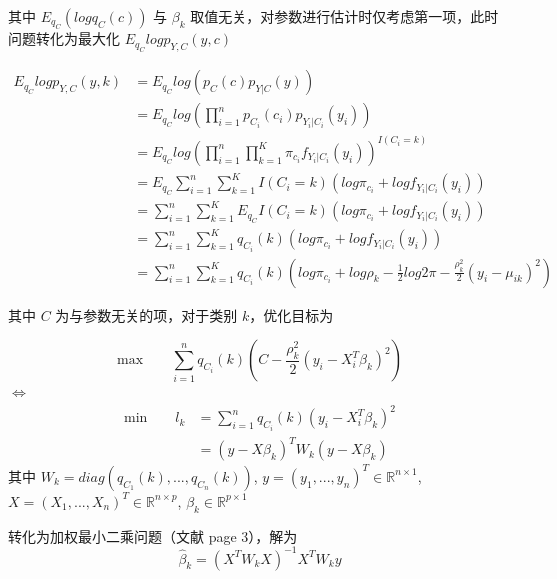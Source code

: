 \documentclass[12pt, a4paper, oneside]{article}
\numberwithin{equation}{section}
\begin{document}
其中 $E_{q_C}\left(log q_C(c)\right)$ 与 $\beta_k$ 取值无关，对参数进行估计时仅考虑第一项，此时问题转化为最大化 $E_{q_C} log p_{Y,C}(y,c)$

\begin{equation}
	\begin{aligned}
		E_{q_C}log p_{Y,C}(y,k) &= E_{q_C} log \left(p_C(c) p_{Y|C}(y)\right)\\
		&= E_{q_C} log \left(\prod^{n}_{i=1} p_{C_i}(c_i) p_{Y_i|C_i}(y_i) \right) \\
		&= E_{q_C} log \left(\prod^{n}_{i=1}\prod^{K}_{k=1} \pi_{c_i} f_{Y_i|C_i}(y_i) \right)^{I(C_i=k)} \\
		&= E_{q_C} \sum^{n}_{i=1}\sum^{K}_{k=1} I(C_i=k)\left( log\pi_{c_i} + log f_{Y_i|C_i}(y_i) \right) \\
		&= \sum^{n}_{i=1}\sum^{K}_{k=1} E_{q_C} I(C_i=k)\left( log\pi_{c_i} + log f_{Y_i|C_i}(y_i) \right) \\
		&= \sum^{n}_{i=1}\sum^{K}_{k=1} q_{C_i}(k)\left( log\pi_{c_i} + log f_{Y_i|C_i}(y_i) \right) \\
		&= \sum^{n}_{i=1}\sum^{K}_{k=1} q_{C_i}(k)\left( log\pi_{c_i} + log \rho_k - \frac{1}{2} log 2\pi - \frac{\rho_k^2}{2}(y_i - \mu_{ik})^2 \right) 
	\end{aligned}
\label{eq:l}
\end{equation}

其中 $C$ 为与参数无关的项，对于类别 $k$，优化目标为

\begin{equation}
	\text{max}\qquad \displaystyle\sum_{i=1}^{n}q_{C_i}(k)\left(C-\frac{\rho_k^2}{2}(y_i - X_i^T \beta_k)^2 \right)
\end{equation}
$\iff$
\begin{equation}
	\begin{aligned}
		\text{min}\qquad l_k &=  \displaystyle\sum_{i=1}^{n}q_{C_i}(k)\left(y_i - X_i^T \beta_k\right)^2 \\
		&= (y - X\beta_k)^T W_k (y - X\beta_k)
	\end{aligned}
\end{equation}
其中 $W_k = diag(q_{C_1}(k),...,q_{C_n}(k))$, $y = (y_1,...,y_n)^T\in \mathbb{R}^{n\times 1}$, $X = (X_1, ..., X_n)^T\in \mathbb{R}^{n\times p}$, $\beta_k \in \mathbb{R}^{p\times 1}$

转化为加权最小二乘问题（文献 \cite{wls} page 3），解为
\begin{equation}
	\hat \beta_k = (X^T W_k X)^{-1}X^T W_k y
\end{equation}
\end{document}

